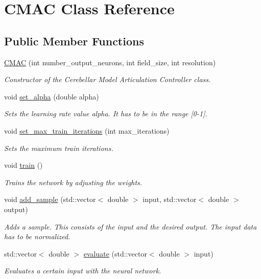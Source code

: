 \hypertarget{class_c_m_a_c}{}\section{C\+M\+AC Class Reference}
\label{class_c_m_a_c}
\subsection*{Public Member Functions}
\begin{DoxyCompactItemize}
\item 
\hyperlink{class_c_m_a_c_adbd41a59beb06605ab5d223ac32da36e}{C\+M\+AC} (int number\+\_\+output\+\_\+neurons, int field\+\_\+size, int resolution)
\begin{DoxyCompactList}\small\item\em Constructor of the Cerebellar Model Articulation Controller class. \end{DoxyCompactList}\item 
void \hyperlink{class_c_m_a_c_a03913bba8d3a52c6b515cb235dcb62f5}{set\+\_\+alpha} (double alpha)
\begin{DoxyCompactList}\small\item\em Sets the learning rate value alpha. It has to be in the range \mbox{[}0-\/1\mbox{]}. \end{DoxyCompactList}\item 
void \hyperlink{class_c_m_a_c_a1e84296568bd4575f770a8394d1022a9}{set\+\_\+max\+\_\+train\+\_\+iterations} (int max\+\_\+iterations)
\begin{DoxyCompactList}\small\item\em Sets the maximum train iterations. \end{DoxyCompactList}\item 
void \hyperlink{class_c_m_a_c_ad3ee680fcbe2c13cc90ed408f3d43df9}{train} ()\hypertarget{class_c_m_a_c_ad3ee680fcbe2c13cc90ed408f3d43df9}{}\label{class_c_m_a_c_ad3ee680fcbe2c13cc90ed408f3d43df9}

\begin{DoxyCompactList}\small\item\em Trains the network by adjusting the weights. \end{DoxyCompactList}\item 
void \hyperlink{class_c_m_a_c_af7f268e519d860fe9719d393f70d1167}{add\+\_\+sample} (std\+::vector$<$ double $>$ input, std\+::vector$<$ double $>$ output)
\begin{DoxyCompactList}\small\item\em Adds a sample. This consists of the input and the desired output. The input data has to be normalized. \end{DoxyCompactList}\item 
std\+::vector$<$ double $>$ \hyperlink{class_c_m_a_c_afc5dd2e1c86fe529a538e56e69b8836c}{evaluate} (std\+::vector$<$ double $>$ input)
\begin{DoxyCompactList}\small\item\em Evaluates a certain input with the neural network. \end{DoxyCompactList}\end{DoxyCompactItemize}


